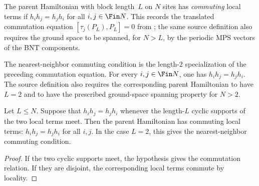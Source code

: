 \begin{definition}\label{def:is_commuting_parent_ham}
    \leanok
    The parent Hamiltonian with block length~$L$ on $N$ sites has
    \emph{commuting} local terms if $h_i h_j=h_j h_i$ for all
    $i,j\in\Fin N$. This records the translated commutation equation
    $[\tau_j(P_L),P_L]=0$ from
    \cite[Definition~3.9]{Cirac2016MPDO_arXiv}; the same source definition
    also requires the ground space to be spanned, for $N>L$, by the periodic
    MPS vectors of the BNT components.
\end{definition}

\begin{definition}\label{def:is_nncph}
    \leanok
    The nearest-neighbor commuting condition is the length-$2$ specialization
    of the preceding commutation equation. For every $i,j\in\Fin N$, one has
    $h_i h_j=h_j h_i$. The source definition
    \cite[Definition~3.9]{Cirac2016MPDO_arXiv} also requires the corresponding
    parent Hamiltonian to have $L=2$ and to have the prescribed ground-space
    spanning property for $N>2$.
\end{definition}

\begin{lemma}
    \label{lem:commuting_parent_ham_overlap_reduction}
    \leanok
    Let $L\le N$. Suppose that $h_i h_j=h_j h_i$ whenever the length-$L$
    cyclic supports of the two local terms meet. Then the parent Hamiltonian
    has commuting local terms: $h_i h_j=h_j h_i$ for all $i,j$. In the case
    $L=2$, this gives the nearest-neighbor commuting condition.
\end{lemma}

\begin{proof}\leanok
    If the two cyclic supports meet, the hypothesis gives the commutation
    relation. If they are disjoint, the corresponding local terms commute by
    locality.
\end{proof}

